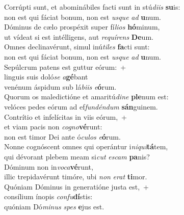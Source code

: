 \evenverse Corrúpti sunt, et abominábiles facti sunt in stú\textit{di}\textit{is} \textbf{su}is:~\*\\
\evenverse non est qui fáciat bonum, non est \textit{us}\textit{que} \textit{ad} \textbf{u}num.\\
\oddverse Dóminus de cælo prospéxit super fí\textit{li}\textit{os} \textbf{hó}minum,~\*\\
\oddverse ut vídeat si est intélligens, aut \textit{re}\textit{quí}\textit{rens} \textbf{De}um.\\
\evenverse Omnes declinavérunt, simul inú\textit{ti}\textit{les} \textbf{fa}cti sunt:~\*\\
\evenverse non est qui fáciat bonum, non est \textit{us}\textit{que} \textit{ad} \textbf{u}num.\\
\oddverse Sepúlcrum patens est guttur eórum:~+\\
\oddverse  linguis suis doló\textit{se} \textit{a}\textbf{gé}bant~\*\\
\oddverse venénum áspidum sub lá\textit{bi}\textit{is} \textit{e}\textbf{ó}rum.\\
\evenverse Quorum os maledictióne et amaritú\textit{di}\textit{ne} \textbf{ple}num est:~\*\\
\evenverse velóces pedes eórum ad ef\textit{fun}\textit{dén}\textit{dum} \textbf{sán}guinem.\\
\oddverse Contrítio et infelícitas in viis eórum,~+\\
\oddverse  et viam pacis non \textit{co}\textit{gno}\textbf{vé}runt:~\*\\
\oddverse non est timor Dei ante ó\textit{cu}\textit{los} \textit{e}\textbf{ó}rum.\\
\evenverse Nonne cognóscent omnes qui operántur i\textit{ni}\textit{qui}\textbf{tá}tem,~\*\\
\evenverse qui dévorant plebem meam si\textit{cut} \textit{e}\textit{scam} \textbf{pa}nis?\\
\oddverse Dóminum non in\textit{vo}\textit{ca}\textbf{vé}runt,~\*\\
\oddverse illic trepidavérunt timóre, ubi \textit{non} \textit{e}\textit{rat} \textbf{ti}mor.\\
\evenverse Quóniam Dóminus in generatióne justa est,~+\\
\evenverse  consílium ínopis \textit{con}\textit{fu}\textbf{dí}stis:~\*\\
\evenverse quóniam Dó\textit{mi}\textit{nus} \textit{spes} \textbf{e}jus est.\\
